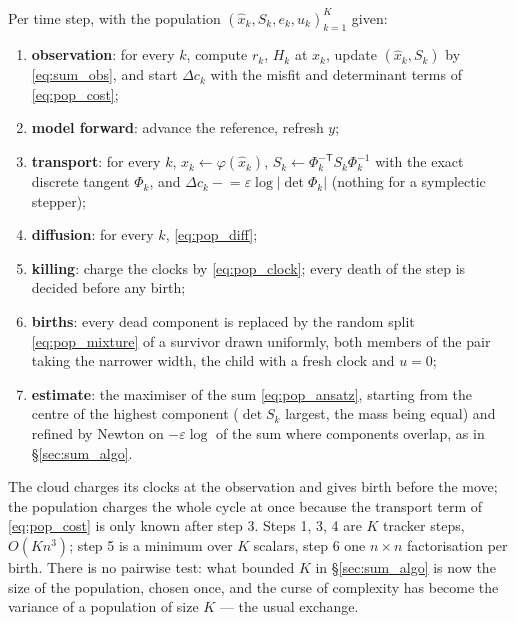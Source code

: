 \documentclass[11pt,a4paper]{article}
\newcommand{\xh}{\hat{x}}
\newcommand{\eps}{\varepsilon}
\newcommand{\abs}[1]{\left\lvert #1 \right\rvert}
\theoremstyle{plain}
\theoremstyle{definition}
\theoremstyle{remark}
\begin{document}
Per time step, with the population $(\xh_k,S_k,e_k,u_k)_{k=1}^K$ given:
\begin{enumerate}[leftmargin=1.5em,nosep]
  \item \textbf{observation}: for every $k$, compute $r_k$, $H_k$ at $\xh_k$, update $(\xh_k,S_k)$ by \eqref{eq:sum_obs}, and start $\Delta c_k$ with the misfit and determinant terms of \eqref{eq:pop_cost};
  \item \textbf{model forward}: advance the reference, refresh $y$;
  \item \textbf{transport}: for every $k$, $\xh_k\leftarrow\varphi(\xh_k)$, $S_k\leftarrow\Phi_k^{-\mathsf T}S_k\Phi_k^{-1}$ with the exact discrete tangent $\Phi_k$, and $\Delta c_k\mathrel{-}=\eps\log\abs{\det\Phi_k}$ (nothing for a symplectic stepper);
  \item \textbf{diffusion}: for every $k$, \eqref{eq:pop_diff};
  \item \textbf{killing}: charge the clocks by \eqref{eq:pop_clock}; every death of the step is decided before any birth;
  \item \textbf{births}: every dead component is replaced by the random split \eqref{eq:pop_mixture} of a survivor drawn uniformly, both members of the pair taking the narrower width, the child with a fresh clock and $u=0$;
  \item \textbf{estimate}: the maximiser of the sum \eqref{eq:pop_ansatz}, starting from the centre of the highest component ($\det S_k$ largest, the mass being equal) and refined by Newton on $-\eps\log$ of the sum where components overlap, as in \S\ref{sec:sum_algo}.
\end{enumerate}
The cloud charges its clocks at the observation and gives birth before the move; the population charges the whole cycle at once because the transport term of \eqref{eq:pop_cost} is only known after step 3. Steps 1, 3, 4 are $K$ tracker steps, $O(Kn^3)$; step 5 is a minimum over $K$ scalars, step 6 one $n\times n$ factorisation per birth. There is no pairwise test: what bounded $K$ in \S\ref{sec:sum_algo} is now the size of the population, chosen once, and the curse of complexity has become the variance of a population of size $K$ --- the usual exchange.
\end{document}
